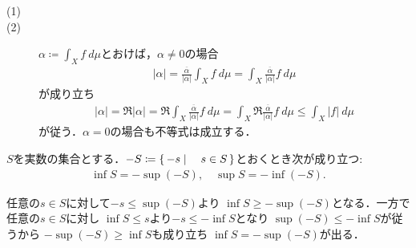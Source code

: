 	\begin{prf}\mbox{}
		\begin{description}
			\item[(1)] 
			
			\item[(2)]
				$\alpha \coloneqq \int_X f\ d\mu$とおけば，$\alpha \neq 0$の場合
				\begin{align}
					|\alpha|
					= \frac{\overline{\alpha}}{|\alpha|} \int_X f\ d\mu
					= \int_X \frac{\overline{\alpha}}{|\alpha|} f\ d\mu
				\end{align}
				が成り立ち
				\begin{align}
					|\alpha| = \Re{|\alpha|}
					= \Re{\int_X \frac{\overline{\alpha}}{|\alpha|} f\ d\mu}
					= \int_X \Re{\frac{\overline{\alpha}}{|\alpha|} f}\ d\mu
					\leq \int_X |f|\ d\mu
				\end{align}
				が従う．$\alpha = 0$の場合も不等式は成立する．
				\QED
		\end{description}
	\end{prf}
	
	\begin{screen}
		\begin{lem}
			$S$を実数の集合とする．$-S \coloneqq \left\{\, -s \mid \quad s \in S\, \right\}$とおくとき次が成り立つ:
			\begin{align}
				\inf{}{S} = -\sup{}{(-S)},
				\quad \sup{}{S} = -\inf{}{(-S)}.
			\end{align}
		\end{lem}
	\end{screen}
	
	\begin{prf}
		任意の$s \in S$に対して$-s \leq \sup{}{(-S)}$より
		$\inf{}{S} \geq -\sup{}{(-S)}$となる．一方で任意の$s \in S$に対し
		$\inf{}{S} \leq s$より$-s \leq -\inf{}{S}$となり
		$\sup{}{(-S)} \leq -\inf{}{S}$が従うから
		$-\sup{}{(-S)} \geq \inf{}{S}$も成り立ち
		$\inf{}{S} = -\sup{}{(-S)}$が出る．
		\QED
	\end{prf}
	
